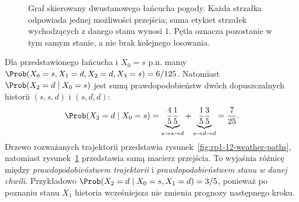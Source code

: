 \begin{figure}[htbp]
\centering
{}
\caption{Graf skierowany dwustanowego łańcucha pogody.
Każda strzałka odpowiada jednej możliwości przejścia;
suma etykiet strzałek wychodzących z danego stanu wynosi $1$.
Pętla oznacza pozostanie w tym samym stanie, a nie brak kolejnego losowania.}
\label{fig:rp1-12-weather-chain}
\end{figure}

\begin{przyklad}
Dla przedstawionego łańcucha i $X_0=s$ p.n. mamy
$\Prob(X_0=s,X_1=d,X_2=d,X_3=s)=6/125$.
Natomiast $\Prob(X_2=d\mid X_0=s)$ jest sumą
prawdopodobieństw dwóch dopuszczalnych historii
$(s,s,d)$ i $(s,d,d)$:
\[
\Prob(X_2=d\mid X_0=s)
=\underbrace{\frac45\frac15}_{s\to s\to d}
+\underbrace{\frac15\frac35}_{s\to d\to d}
=\frac7{25}.
\]
Drzewo rozważanych trajektorii przedstawia
rysunek~\ref{fig:rp1-12-weather-paths}, natomiast
rysunek~\ref{fig:rp1-12-weather-chain} przedstawia
samą macierz przejścia.
To wyjaśnia różnicę między \emph{prawdopodobieństwem
trajektorii} i \emph{prawdopodobieństwem stanu w danej chwili}.
Przykładowo
$\Prob(X_2=d\mid X_0=s,X_1=d)=3/5$,
ponieważ po poznaniu stanu $X_1$ historia wcześniejsza
nie zmienia prognozy następnego kroku.
\end{przyklad}


